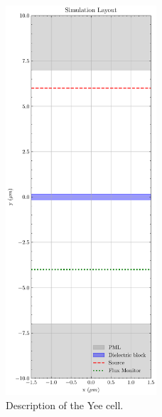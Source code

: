 \begin{figure}[H]\label{fig:yee}
  \centering
  \includegraphics[width=0.5\textwidth]{obrazky-figures/sim-layout.pdf}
  \caption{Description of the Yee cell.}
\end{figure}




